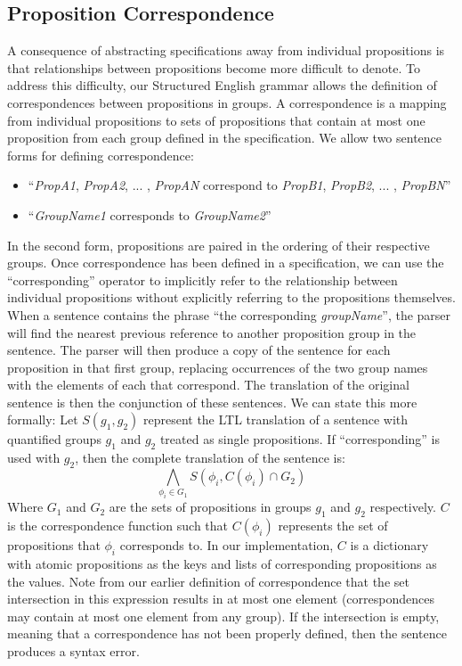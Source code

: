 \subsection{Proposition Correspondence} 
A consequence of abstracting specifications away from individual propositions is that relationships between propositions become more difficult to denote. 
To address this difficulty, our Structured English grammar allows the definition of correspondences between propositions in groups. 
A correspondence is a mapping from individual propositions to sets of propositions that contain at most one proposition from each group defined in the specification. 
We allow two sentence forms for defining correspondence: 
\begin{itemize}
	\item ``\textit{PropA1}, \textit{PropA2}, ... , \textit{PropAN} correspond to \textit{PropB1}, \textit{PropB2}, ... , \textit{PropBN}''
	\item ``\textit{GroupName1} corresponds to \textit{GroupName2}''
\end{itemize} 
In the second form, propositions are paired in the ordering of their respective groups. 
Once correspondence has been defined in a specification, we can use the ``corresponding'' operator to implicitly refer to the relationship between individual propositions without explicitly referring to the propositions themselves. 
When a sentence contains the phrase ``the corresponding \textit{groupName}'', the parser will find the nearest previous reference to another proposition group in the sentence. 
The parser will then produce a copy of the sentence for each proposition in that first group, replacing occurrences of the two group names with the elements of each that correspond. 
The translation of the original sentence is then the conjunction of these sentences. 
We can state this more formally: Let $S(g_1,g_2)$ represent the LTL translation of a sentence with quantified groups $g_1$ and $g_2$ treated as single propositions. 
If ``corresponding'' is used with $g_2$, then the complete translation of the sentence is:
\begin{equation*}
	\bigwedge \limits_{\phi_i \in G_1} S(\phi_i, C(\phi_i) \cap G_2)
\end{equation*}
Where $G_1$ and $G_2$ are the sets of propositions in groups $g_1$ and $g_2$ respectively.
$C$ is the correspondence function such that $C(\phi_i)$ represents the set of propositions that $\phi_i$ corresponds to. 
In our implementation, $C$ is a dictionary with atomic propositions as the keys and lists of corresponding propositions as the values. 
Note from our earlier definition of correspondence that the set intersection in this expression results in at most one element (correspondences may contain at most one element from any group). 
If the intersection is empty, meaning that a correspondence has not been properly defined, then the sentence produces a syntax error. 

